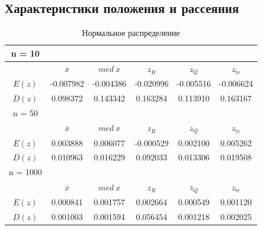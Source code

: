\documentclass[12pt,a4paper]{article}
\begin{document}
	\newpage

	\subsection{Характеристики положения и рассеяния}

	\begin{table}[h!]
		\centering
		\begin{tabular}{ |c|c|c|c|c|c| }
			\hline
			n = 10 & & & & & \\
			\hline
			&$\overline{x}$ & $med\ x$ & $z_{R}$ & $z_{Q}$ & $z_{tr}$\\
			\hline
			$E(z)$ & -0.007982 & -0.004386 & -0.020996 & -0.005516 & -0.006624 \\
			\hline
			$D(z) $ & 0.098372 & 0.143342 & 0.163284 & 0.113910 & 0.163167 \\
			\hline\hline
			n = 50 & & & & & \\
			\hline
			&$\overline{x}$ & $med\ x$ & $z_{R}$ & $z_{Q}$ & $z_{tr}$\\
			\hline
			$E(z)$ & 0.003888 & 0.006077 & -0.000529 & 0.002100 & 0.005262 \\
			\hline
			$D(z)$ & 0.010963 & 0.016229 & 0.092033 & 0.013306 & 0.019508 \\
			\hline\hline
			n = 1000 & & & & & \\
			\hline
			&$\overline{x}$ & $med\ x$ & $z_{R}$ & $z_{Q}$ & $z_{tr}$\\
			\hline
			$E(z)$ & 0.000841 & 0.001757 & 0.002664 & 0.000549 & 0.001120 \\
			\hline
			$D(z)$ & 0.001003 & 0.001594 & 0.056454 & 0.001218 & 0.002025 \\
			\hline
		\end{tabular}
		\caption{Нормальное распределение}
		\label{table:1}
	\end{table}
\end{document}

